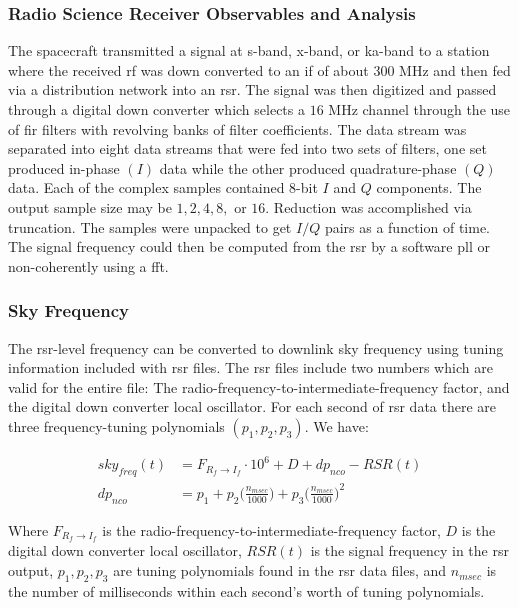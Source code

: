 \documentclass[oneside]{book}
\theoremstyle{mystyle}
\begin{document}
\subsubsection{Radio Science Receiver Observables and Analysis}

The spacecraft transmitted a signal at \gls{s-band}, \gls{x-band}, or \gls{ka-band} to a station where the received \gls{rf} was down converted to an \gls{if} of about $300$ MHz and then fed via a \gls{distribution network} into an \gls{rsr}. The signal was then digitized and passed through a digital down converter which selects a $16$ MHz channel through the use of \gls{fir} filters with revolving banks of filter coefficients. The data stream was separated into eight  data streams that were fed into two sets of filters, one set produced \gls{in-phase} $(I)$ data while the other produced \gls{quadrature-phase} $(Q)$ data. Each of the complex samples contained $8$-bit $I$ and $Q$ components. The output sample size may be $1,2,4,8,$ or $16$. Reduction was accomplished via \gls{truncation}. The samples were unpacked to get $I/Q$ pairs as a function of time. The signal \gls{frequency} could then be computed from the \gls{rsr} by a software \gls{pll} or non-coherently using a \gls{fft}. 

\subsubsection{\footnotesize Sky Frequency}

The \gls{rsr}-level \gls{frequency} can be converted to \gls{downlink} \gls{sky frequency} using tuning information included with \gls{rsr} files. The \gls{rsr} files include two numbers which are valid for the entire file: The radio-frequency-to-intermediate-frequency factor, and the digital down converter local oscillator. For each second of \gls{rsr} data there are three \glspl{frequency-tuning polynomial} $(p_{1},p_{2},p_{3})$. We have:

\begin{align}
sky_{freq}(t) &= F_{R_{f}\rightarrow I_{f}}\cdot 10^{6} + D+dp_{nco}-RSR(t) \label{equ:usr_sky_freq_t}\\
dp_{nco} &= p_1+p_2 \bigg(\frac{n_{msec}}{1000}\bigg)+p_3 \bigg(\frac{n_{msec}}{1000}\bigg)^2 \label{equ:usr_dp_nco}
\end{align}

\noindent Where $F_{R_{f}\rightarrow I_{f}}$ is the radio-frequency-to-intermediate-frequency factor, $D$ is the digital down converter local oscillator, $RSR(t)$ is the signal frequency in the \gls{rsr} output, $p_1,p_2,p_3$ are tuning polynomials found in the \gls{rsr} data files, and $n_{msec}$ is the number of milliseconds within each second's worth of tuning polynomials. 
\end{document}
